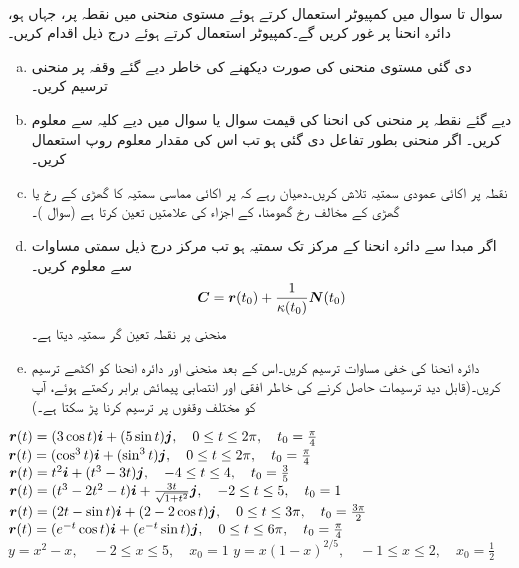 \\
سوال  تا سوال  میں کمپیوٹر استعمال کرتے ہوئے مستوی منحنی میں   نقطہ  پر،   جہاں   ہو،   دائرہ انحنا   پر غور کریں گے۔کمپیوٹر استعمال کرتے ہوئے درج ذیل اقدام کریں۔
\begin{enumerate}[a.]
\item
دی گئی مستوی منحنی کی صورت دیکھنے کی خاطر دیے گئے وقفہ پر  منحنی ترسیم کریں۔
\item
دیے گئے نقطہ  پر منحنی کی انحنا  کی قیمت   سوال  یا سوال  میں دیے کلیہ سے معلوم کریں۔ اگر منحنی  بطور تفاعل  دی گئی ہو تب اس کی مقدار معلوم روپ  استعمال کریں۔
\item
نقطہ  پر اکائی عمودی سمتیہ  تلاش کریں۔دھیان رہے کہ     پر اکائی مماسی سمتیہ   کا گھڑی کے رخ یا گھڑی کے مخالف رخ  گھومنا،    کے اجزاء کی علامتیں  تعین کرتا ہے (سوال )۔
\item
اگر مبدا سے دائرہ انحنا کے مرکز  تک سمتیہ  ہو تب مرکز  درج ذیل سمتی مساوات سے معلوم کریں۔
\begin{align*}
{\ensuremath{{\boldsymbol{C}}}}={{\boldsymbol{r}}}(t_0)+\frac{1}{\kappa(t_0)}{{\boldsymbol{N}}}(t_0)
\end{align*}
منحنی پر نقطہ  تعین گر سمتیہ  دیتا ہے۔
\item
دائرہ انحنا کی خفی مساوات  ترسیم کریں۔اس کے بعد منحنی اور دائرہ انحنا کو اکٹھے ترسیم کریں۔(قابل دید ترسیمات  حاصل کرنے کی خاطر افقی اور انتصابی پیمائش برابر رکھتے ہوئے،   آپ کو  مختلف وقفوں پر ترسیم کرنا  پڑ سکتا ہے۔)
\end{enumerate}

${{\boldsymbol{r}}}(t)=(3\cos t){\boldsymbol{i}}+(5\sin t){\boldsymbol{j}},\quad 0\le t\le 2\pi,\quad t_0=\tfrac{\pi}{4}$
${{\boldsymbol{r}}}(t)=(\cos^3t){\boldsymbol{i}}+(\sin^3t){\boldsymbol{j}},\quad 0\le t\le 2\pi,\quad t_0=\tfrac{\pi}{4}$
${{\boldsymbol{r}}}(t)=t^2{\boldsymbol{i}}+(t^3-3t){\boldsymbol{j}},\quad -4\le t\le 4,\quad t_0=\tfrac{3}{5}$
${{\boldsymbol{r}}}(t)=(t^3-2t^2-t){\boldsymbol{i}}+\tfrac{3t}{\sqrt{1+t^2}}{\boldsymbol{j}},\quad -2\le t\le 5,\quad t_0=1$
${{\boldsymbol{r}}}(t)=(2t-\sin t){\boldsymbol{i}}+(2-2\cos t){\boldsymbol{j}},\quad  0\le t\le 3\pi,\quad t_0=\tfrac{3\pi}{2}$
${{\boldsymbol{r}}}(t)=(e^{-t}\cos t){\boldsymbol{i}}+(e^{-t}\sin t){\boldsymbol{j}},\quad 0\le t\le 6\pi,\quad t_0=\tfrac{\pi}{4}$
$y=x^2-x,\quad -2\le x\le 5,\quad x_0=1$
$y=x(1-x)^{2/5},\quad -1\le x\le 2,\quad x_0=\tfrac{1}{2}$

